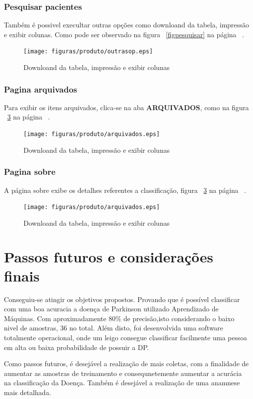 \subsubsection{Pesquisar pacientes}
Também é possivel execultar outras opções como downloand da tabela, impressão e exibir colunas. Como pode ser observado na figura ~\ref{figpesquisar} na página ~\pageref{figpesquisar}.
\begin{figure}[!htb]
	\centering
	\texttt{[image: figuras/produto/outrasop.eps]}
	\caption{Downloand da tabela, impressão e exibir colunas}
	\label{figoutrasop}
\end{figure}

\subsubsection{Pagina arquivados}
Para exibir os itens arquivados, clica-se na aba \textbf{ARQUIVADOS}, como na figura ~\ref{farquivados} na página ~\pageref{farquivados}.
\begin{figure}[!htb]
	\centering
	\texttt{[image: figuras/produto/arquivados.eps]}
	\caption{Downloand da tabela, impressão e exibir colunas}
	\label{farquivados}
\end{figure}

\subsubsection{Pagina sobre}
A página sobre exibe os detalhes referentes a classificação, figura ~\ref{farquivados} na página ~\pageref{farquivados}.
\begin{figure}[!htb]
	\centering
	\texttt{[image: figuras/produto/arquivados.eps]}
	\caption{Downloand da tabela, impressão e exibir colunas}
	\label{farquivados}
\end{figure}

\section{Passos futuros e considerações finais}
    Conseguiu-se atingir os objetivos propostos. Provando que é possível classificar com uma boa acuracia a doença de Parkinson utilizado Aprendizado de Máquinas. Com aproximadamente 80\% de precisão,isto considerando o baixo nivel de amostras, 36 no total. Além disto, foi desenvolvida uma software totalmente operacional, onde um leigo consegue classificar facilmente uma pessoa em alta ou baixa probabilidade de possuir a DP.

    Como passos futuros, é desejável a realização de mais coletas, com a finalidade de aumentar as amostras de treinamento e consequnetemente aumentar a acurácia na classificação da Doença. Também é desejável a realização de uma anamnese mais detalhada.